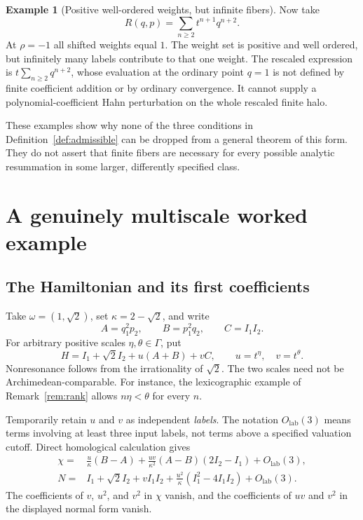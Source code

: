 \documentclass[11pt,letterpaper]{article}
\numberwithin{equation}{section}
\theoremstyle{definition}
\newtheorem{example}[theorem]{Example}
\theoremstyle{remark}
\newcommand{\lab}{\mathrm{lab}}
\begin{document}
\begin{example}[Positive well-ordered weights, but infinite fibers]
\label{ex:badfiber}
Now take
\[
 R(q,p)=\sum_{n\ge2}t^{n+1}q^{n+2}.
\]
At $\rho=-1$ all shifted weights equal $1$. The weight set is positive and
well ordered, but infinitely many labels contribute to that one weight.
The rescaled expression is $t\sum_{n\ge2}q^{n+2}$, whose evaluation at the
ordinary point $q=1$ is not defined by finite coefficient addition or by
ordinary convergence. It cannot supply a polynomial-coefficient Hahn
perturbation on the whole rescaled finite halo.
\end{example}
These examples show why none of the three conditions in
Definition~\ref{def:admissible} can be dropped from a general theorem of
this form. They do not assert that finite fibers are necessary for every
possible analytic resummation in some larger, differently specified class.

\section{A genuinely multiscale worked example}
\label{sec:example}

\subsection{The Hamiltonian and its first coefficients}
Take $\omega=(1,\sqrt2)$, set $\kappa=2-\sqrt2$, and write
\[
 A=q_1^2p_2,\qquad B=p_1^2q_2,\qquad C=I_1I_2.
\]
For arbitrary positive scales $\eta,\theta\in\Gamma$, put
\begin{equation}\label{eq:workedH}
 H=I_1+\sqrt2 I_2+u(A+B)+vC,
 \qquad u=t^\eta,\quad v=t^\theta.
\end{equation}
Nonresonance follows from the irrationality of $\sqrt2$. The two scales need
not be Archimedean-comparable. For instance, the lexicographic example of
Remark~\ref{rem:rank} allows $n\eta<\theta$ for every $n$.

Temporarily retain $u$ and $v$ as independent \emph{labels}. The notation
$O_\lab(3)$ means terms involving at least three input labels, not terms
above a specified valuation cutoff. Direct homological calculation gives
\begin{align}
 \chi={}&\frac{u}{\kappa}(B-A)
 +\frac{uv}{\kappa^2}(A-B)(2I_2-I_1)+O_\lab(3),
 \label{eq:workedchi}\\
 N={}&I_1+\sqrt2 I_2+vI_1I_2
 +\frac{u^2}{\kappa}(I_1^2-4I_1I_2)+O_\lab(3).
 \label{eq:workedN}
\end{align}
The coefficients of $v$, $u^2$, and $v^2$ in $\chi$ vanish, and the
coefficients of $uv$ and $v^2$ in the displayed normal form vanish.
\end{document}

